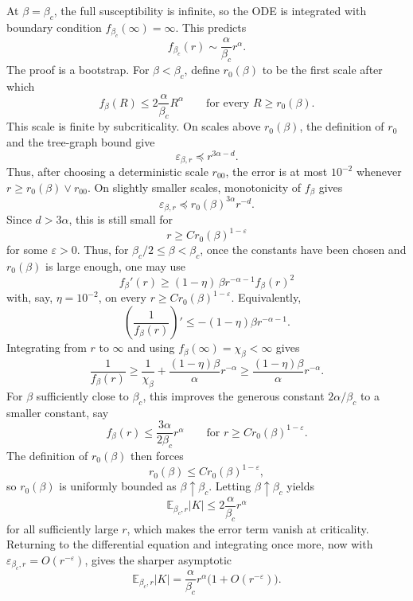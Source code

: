 \documentclass[11pt,reqno]{book}
\numberwithin{equation}{chapter}
\theoremstyle{plain}
\theoremstyle{definition}
\theoremstyle{remark}
\newcommand{\eps}{\varepsilon}
\newcommand{\1}{\mathbf 1}
\newcommand{\pre}{\preceq}
\begin{document}
At $\beta=\beta_c$, the full susceptibility is infinite, so the ODE is integrated with boundary condition $f_{\beta_c}(\infty)=\infty$. This predicts
\[
  f_{\beta_c}(r)\sim \frac{\alpha}{\beta_c}r^\alpha.
\]
The proof is a bootstrap. For $\beta<\beta_c$, define $r_0(\beta)$ to be the first scale after which
\[
  f_\beta(R)\leq 2\frac{\alpha}{\beta_c}R^\alpha
  \qquad\text{for every }R\geq r_0(\beta).
\]
This scale is finite by subcriticality. On scales above \(r_0(\beta)\), the
definition of \(r_0\) and the tree-graph bound give
\[
  \varepsilon_{\beta,r}\pre r^{3\alpha-d}.
\]
Thus, after choosing a deterministic scale \(r_{00}\), the error is at most
\(10^{-2}\) whenever \(r\geq r_0(\beta)\vee r_{00}\). On slightly smaller
scales, monotonicity of \(f_\beta\) gives
\[
  \varepsilon_{\beta,r}\pre r_0(\beta)^{3\alpha}r^{-d}.
\]
Since $d>3\alpha$, this is still small for
\[
  r\geq C r_0(\beta)^{1-\eps}
\]
for some $\eps>0$. Thus, for \(\beta_c/2\leq\beta<\beta_c\), once the constants have been chosen and \(r_0(\beta)\) is large enough, one may use
\[
  f_\beta'(r)\geq (1-\eta)\,\beta r^{-\alpha-1}f_\beta(r)^2
\]
with, say, \(\eta=10^{-2}\), on every \(r\geq C r_0(\beta)^{1-\eps}\).
Equivalently,
\[
  \left(\frac1{f_\beta(r)}\right)'
  \leq
  -(1-\eta)\beta r^{-\alpha-1}.
\]
Integrating from \(r\) to \(\infty\) and using
\(f_\beta(\infty)=\chi_\beta<\infty\) gives
\[
  \frac1{f_\beta(r)}
  \geq
  \frac1{\chi_\beta}
  +
  \frac{(1-\eta)\beta}{\alpha}r^{-\alpha}
  \geq
  \frac{(1-\eta)\beta}{\alpha}r^{-\alpha}.
\]
For \(\beta\) sufficiently close to \(\beta_c\), this improves the generous constant \(2\alpha/\beta_c\) to a smaller constant, say
\[
  f_\beta(r)\leq \frac{3\alpha}{2\beta_c}r^\alpha
  \qquad
  \text{for }r\geq C r_0(\beta)^{1-\eps}.
\]
The definition of $r_0(\beta)$ then forces
\[
  r_0(\beta)\leq C r_0(\beta)^{1-\eps},
\]
so $r_0(\beta)$ is uniformly bounded as $\beta\uparrow\beta_c$.
Letting \(\beta\uparrow\beta_c\) yields
\[
  \mathbb E_{\beta_c,r}|K|
  \leq
  2\frac{\alpha}{\beta_c}r^\alpha
\]
for all sufficiently large \(r\), which makes the error term vanish at
criticality. Returning to the differential equation and integrating once
more, now with \(\varepsilon_{\beta_c,r}=O(r^{-\eps})\), gives the sharper
asymptotic
\[
  \mathbb E_{\beta_c,r}|K|
  =
  \frac{\alpha}{\beta_c}r^\alpha
  \bigl(1+O(r^{-\eps})\bigr).
\]
\end{document}
